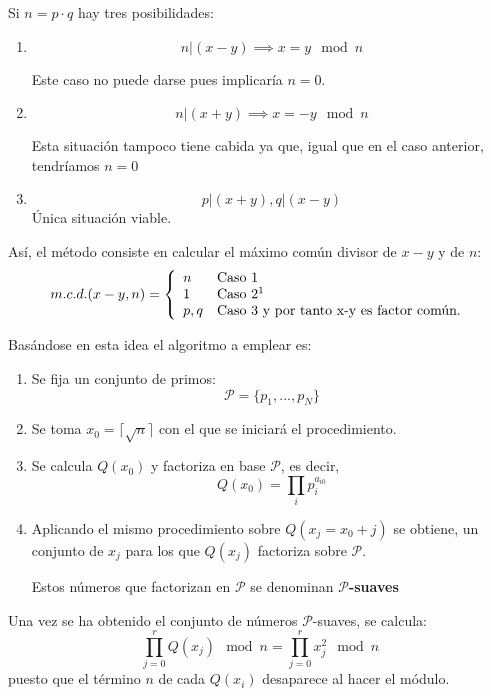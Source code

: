 \documentclass[nochap]{apuntesURJC}
\begin{document}
Si  $n=p\cdot q$ hay tres posibilidades:
\begin{enumerate}
\item
\[n|(x-y) \implies x=y \mod n\]

Este caso no puede darse pues implicaría $n=0$.

\item
\[n|(x+y) \implies x=-y \mod n\]

Esta situación tampoco tiene cabida ya que, igual que en el caso anterior, tendríamos $n=0$

\item
\[p|(x+y), q|(x-y)\]
Única situación viable.
\end{enumerate}

Así, el método consiste en calcular el máximo común divisor de $x-y$ y de $n$:
\[m.c.d.(x-y,n) = \left\{ \begin{array}{ll}
             n &   \text{Caso 1} \\
             1 &   \text{Caso 2}\footnotemark\\
             p,q & \text{Caso 3 y por tanto x-y es factor común.}
             \end{array}\right.\]


Basándose en esta idea el algoritmo a emplear es:

\begin{enumerate}
\item Se fija un conjunto de primos:
\[\mathcal{P} = \{p_1,...,p_N\}\]

\item Se toma $x_0=\lceil\sqrt{n}\rceil$ con el que se iniciará el procedimiento.

\item Se calcula $Q(x_0)$ y factoriza en base $\mathcal{P}$, es decir,
\[Q(x_0) = \prod_i p_i^{a_{i0}}\]

\item Aplicando el mismo procedimiento sobre $Q(x_j=x_0+j)$ se obtiene, un conjunto de $x_j$ para los que $Q(x_j)$ factoriza sobre $\mathcal{P}$.

Estos números que factorizan en $\mathcal{P}$ se denominan \textbf{$\mathcal{P}$-suaves}
\end{enumerate}

Una vez se ha obtenido el conjunto de números $\mathcal{P}$-suaves, se calcula:
\[\prod_{j=0}^rQ(x_j) \mod n=\prod_{j=0}^rx_j^2 \mod n\]
puesto que el término $n$ de cada $Q(x_i)$ desaparece al hacer el módulo.
\end{document}
